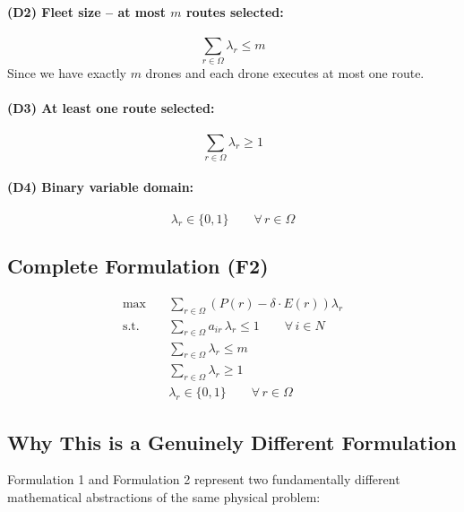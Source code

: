\documentclass[12pt,a4paper]{article}
\begin{document}
\paragraph{(D2) Fleet size -- at most $m$ routes selected:}
\begin{equation}
  \sum_{r \in \Omega} \lambda_r \leq m
  \tag{D2}
\end{equation}
Since we have exactly $m$ drones and each drone executes at most one route.

\paragraph{(D3) At least one route selected:}
\begin{equation}
  \sum_{r \in \Omega} \lambda_r \geq 1
  \tag{D3}
\end{equation}

\paragraph{(D4) Binary variable domain:}
\begin{equation}
  \lambda_r \in \{0,1\}
  \qquad \forall\, r \in \Omega
  \tag{D4}
\end{equation}

\subsection{Complete Formulation (F2)}

\begin{align*}
  \max \quad & \sum_{r \in \Omega} \left( P(r) - \delta \cdot E(r) \right) \lambda_r \\
  \text{s.t.} \quad
  & \sum_{r \in \Omega} a_{ir} \, \lambda_r \leq 1 \qquad \forall\, i \in N \\
  & \sum_{r \in \Omega} \lambda_r \leq m \\
  & \sum_{r \in \Omega} \lambda_r \geq 1 \\
  & \lambda_r \in \{0,1\} \qquad \forall\, r \in \Omega
\end{align*}

\subsection{Why This is a Genuinely Different Formulation}

Formulation 1 and Formulation 2 represent two fundamentally different mathematical
abstractions of the same physical problem:
\end{document}
